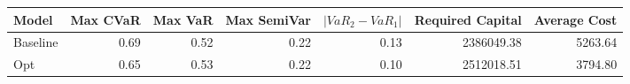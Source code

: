 \begin{tabular}{lrrrrrr}
\toprule
   Model &  Max CVaR &  Max VaR &  Max SemiVar &  $|VaR_2 - VaR_1|$ &  Required Capital &  Average Cost \\
\midrule
Baseline &      0.69 &     0.52 &         0.22 &               0.13 &        2386049.38 &       5263.64 \\
     Opt &      0.65 &     0.53 &         0.22 &               0.10 &        2512018.51 &       3794.80 \\
\bottomrule
\end{tabular}
